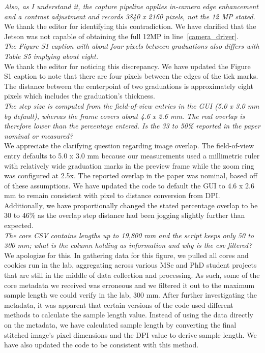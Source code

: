 \documentclass[12pt,a4paper]{article}
\newcommand{\lr}[1]{line~\ref{#1}}
\begin{document}
\emph{Also, as I understand it, the capture pipeline applies in-camera edge enhancement and a contrast adjustment and records 3840 x 2160 pixels, not the 12 MP stated.} \\

We thank the editor for identifying this contradiction. We have clarified that the Jetson was not capable of obtaining the full 12MP in \lr{camera_driver}. \\


\emph{The Figure S1 caption with about four pixels between graduations also differs with Table S5 implying about eight.} \\

We thank the editor for noticing this discrepancy. We have updated the Figure S1 caption to note that there are four pixels between the edges of the tick marks. The distance between the centerpoint of two graduations is approximately eight pixels which includes the graduation's thickness. \\

\emph{The step size is computed from the field-of-view entries in the GUI (5.0 x 3.0 mm by default), whereas the frame covers about 4.6 x 2.6 mm. The real overlap is therefore lower than the percentage entered. Is the 33 to 50\% reported in the paper nominal or measured?} \\

We appreciate the clarifying question regarding image overlap. The field-of-view entry defaults to 5.0 x 3.0 mm because our measurements used a millimetric ruler with relatively wide graduation marks in the preview frame while the zoom ring was configured at 2.5x. The reported overlap in the paper was nominal, based off of these assumptions. We have updated the code to default the GUI to 4.6 x 2.6 mm to remain consistent with pixel to distance conversion from DPI. Additionally, we have proportionally changed the stated percentage overlap to be 30 to 46\% as the overlap step distance had been jogging slightly further than expected. \\

\emph{The core CSV contains lengths up to 19,800 mm and the script keeps only 50 to 300 mm; what is the column holding as information and why is the csv filtered?} \\

We apologize for this. In gathering data for this figure, we pulled all cores and cookies run in the lab, aggregating across various MSc and PhD student projects that are still in the middle of data collection and processing. As such, some of the core metadata we received was erroneous and we filtered it out to the maximum sample length we could verify in the lab, 300 mm. After further investigating the metadata, it was apparent that certain versions of the code used different methods to calculate the sample length value. Instead of using the data directly on the metadata, we have calculated sample length by converting the final stitched image's pixel dimensions and the DPI value to derive sample length. We have also updated the code to be consistent with this method. \\
\end{document}
